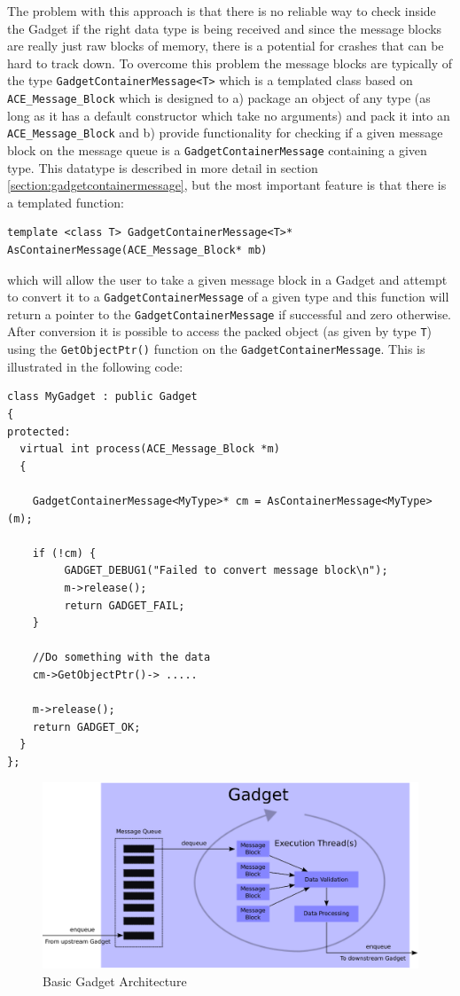 \documentclass[11pt]{article}
\begin{document}
\noindent
The problem with this approach is that there is no reliable way to check inside the Gadget if the right data type is being received and since the message blocks are really just raw blocks of memory, there is a potential for crashes that can be hard to track down. To overcome this problem the message blocks are typically of the type \texttt{GadgetContainerMessage<T>} which is a templated class based on \texttt{ACE\_Message\_Block} which is designed to a) package an object of any type (as long as it has a default constructor which take no arguments) and pack it into an \texttt{ACE\_Message\_Block} and b) provide functionality for checking if a given message block on the message queue is a \texttt{GadgetContainerMessage} containing a given type. This datatype is described in more detail in section \ref{section:gadgetcontainermessage}, but the most important feature is that there is a templated function:
{\scriptsize 
\begin{verbatim}
template <class T> GadgetContainerMessage<T>* AsContainerMessage(ACE_Message_Block* mb)
\end{verbatim}}
\noindent
which will allow the user to take a given message block in a Gadget and attempt to convert it to a \texttt{GadgetContainerMessage} of a given type and this function will return a pointer to the \texttt{GadgetContainerMessage} if successful and zero otherwise. After conversion it is possible to access the packed object (as given by type \texttt{T}) using the \texttt{GetObjectPtr()} function on the \texttt{GadgetContainerMessage}. This is illustrated in the following code:
{\scriptsize 
\begin{verbatim}
class MyGadget : public Gadget
{
protected:
  virtual int process(ACE_Message_Block *m)
  {
    
    GadgetContainerMessage<MyType>* cm = AsContainerMessage<MyType>(m);
    
    if (!cm) {
         GADGET_DEBUG1("Failed to convert message block\n");
         m->release();
         return GADGET_FAIL;
    } 
    
    //Do something with the data
    cm->GetObjectPtr()-> .....
    
    m->release();
    return GADGET_OK;
  }
};
\end{verbatim}}

\begin{figure}[htbp] %
   \centering
   \includegraphics[width=6in]{figures/gadget.eps} 
   \caption{Basic Gadget Architecture}
   \label{fig:gadget}
\end{figure}
\end{document}
